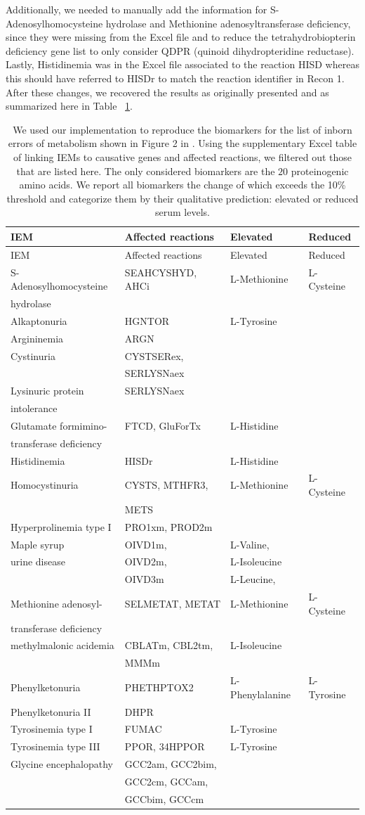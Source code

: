 \documentclass[10pt,a4paper,onecolumn]{article}
\begin{document}
Additionally, we needed to manually add the information for
S-Adenosylhomocysteine hydrolase and Methionine adenosyltransferase
deficiency, since they were missing from the Excel file and to reduce
the tetrahydrobiopterin deficiency gene list to only consider QDPR
(quinoid dihydropteridine reductase). Lastly, Histidinemia was in the
Excel file associated to the reaction HISD whereas this should have
referred to HISDr to match the reaction identifier in Recon 1. After
these changes, we recovered the results as originally presented and as
summarized here in Table ~\ref{tbl:amino_acid_iems}.

\begin{longtable}[]{@{}llll@{}}
\caption{\label{tbl:amino_acid_iems}We used our implementation to
reproduce the biomarkers for the list of inborn errors of metabolism
shown in Figure 2 in \autocite{Shlomi2009}. Using the supplementary
Excel table of \autocite{Shlomi2009} linking IEMs to causative genes and
affected reactions, we filtered out those that are listed here. The only
considered biomarkers are the \(20\) proteinogenic amino acids. We
report all biomarkers the change of which exceeds the 10\% threshold and
categorize them by their qualitative prediction: elevated or reduced
serum levels. }\tabularnewline
\toprule
IEM & Affected reactions & Elevated & Reduced\tabularnewline
\midrule
\endfirsthead
\toprule
IEM & Affected reactions & Elevated & Reduced\tabularnewline
\midrule
\endhead
S-Adenosylhomocysteine & SEAHCYSHYD, AHCi & L-Methionine &
L-Cysteine\tabularnewline
hydrolase & & &\tabularnewline
Alkaptonuria & HGNTOR & L-Tyrosine &\tabularnewline
Argininemia & ARGN & &\tabularnewline
Cystinuria & CYSTSERex, & &\tabularnewline
& SERLYSNaex & &\tabularnewline
Lysinuric protein & SERLYSNaex & &\tabularnewline
intolerance & & &\tabularnewline
Glutamate formimino- & FTCD, GluForTx & L-Histidine &\tabularnewline
transferase deficiency & & &\tabularnewline
Histidinemia & HISDr & L-Histidine &\tabularnewline
Homocystinuria & CYSTS, MTHFR3, & L-Methionine &
L-Cysteine\tabularnewline
& METS & &\tabularnewline
Hyperprolinemia type I & PRO1xm, PROD2m & &\tabularnewline
Maple syrup & OIVD1m, & L-Valine, &\tabularnewline
urine disease & OIVD2m, & L-Isoleucine &\tabularnewline
& OIVD3m & L-Leucine, &\tabularnewline
Methionine adenosyl- & SELMETAT, METAT & L-Methionine &
L-Cysteine\tabularnewline
transferase deficiency & & &\tabularnewline
methylmalonic acidemia & CBLATm, CBL2tm, & L-Isoleucine &\tabularnewline
& MMMm & &\tabularnewline
Phenylketonuria & PHETHPTOX2 & L-Phenylalanine &
L-Tyrosine\tabularnewline
Phenylketonuria II & DHPR & &\tabularnewline
Tyrosinemia type I & FUMAC & L-Tyrosine &\tabularnewline
Tyrosinemia type III & PPOR, 34HPPOR & L-Tyrosine &\tabularnewline
Glycine encephalopathy & GCC2am, GCC2bim, & &\tabularnewline
& GCC2cm, GCCam, & &\tabularnewline
& GCCbim, GCCcm & &\tabularnewline
\bottomrule
\end{longtable}
\end{document}
